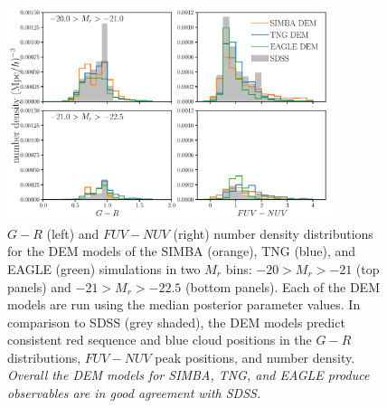 \begin{figure}
\begin{center}
    \includegraphics[width=0.85\textwidth]{figs/abc_observables_mr_bin.pdf}
    \caption{\label{fig:demcloseup}
    $G-R$ (left) and $FUV-NUV$ (right) number density distributions for the DEM
    models of the SIMBA (orange), TNG (blue), and EAGLE (green) simulations in
    two $M_r$ bins: $-20 > M_r > -21$ (top panels) and $-21 > M_r > -22.5$
    (bottom panels).  Each of the DEM models are run using the median posterior
    parameter values. In comparison to SDSS (grey shaded), the DEM models predict 
    consistent red sequence and blue cloud positions in the $G-R$ distributions, 
    $FUV-NUV$ peak positions, and number density. {\em Overall the DEM
    models for SIMBA, TNG, and EAGLE produce observables are in good agreement 
    with SDSS.}
    }
\end{center}
\end{figure}


